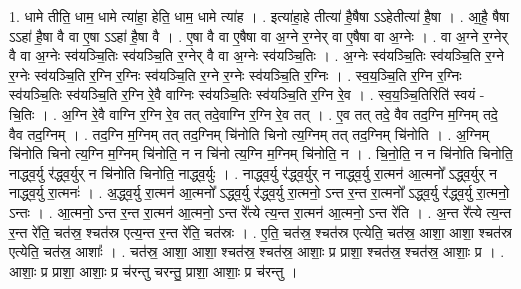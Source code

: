 \documentclass[17pt]{extarticle}
\begin{document}
1. धामे तीति॒ धाम॒ धामे त्या॑हा॒ हेति॒ धाम॒ धामे त्या॑ह । . इत्या॑हा॒हे तीत्या॑ है॒षैषा ऽऽहेतीत्या॑ है॒षा । . आ॒है॒ षैषा ऽऽहा॑ है॒षा वै वा ए॒षा ऽऽहा॑ है॒षा वै । . ए॒षा वै वा ए॒षैषा वा अ॒ग्ने र॒ग्नेर् वा ए॒षैषा वा अ॒ग्नेः । . वा अ॒ग्ने र॒ग्नेर् वै वा अ॒ग्नेः स्व॑यञ्चि॒तिः स्व॑यञ्चि॒ति र॒ग्नेर् वै वा अ॒ग्नेः स्व॑यञ्चि॒तिः । . अ॒ग्नेः स्व॑यञ्चि॒तिः स्व॑यञ्चि॒ति र॒ग्ने र॒ग्नेः स्व॑यञ्चि॒ति र॒ग्नि र॒ग्निः स्व॑यञ्चि॒ति र॒ग्ने र॒ग्नेः स्व॑यञ्चि॒ति र॒ग्निः । . स्व॒य॒ञ्चि॒ति र॒ग्नि र॒ग्निः स्व॑यञ्चि॒तिः स्व॑यञ्चि॒ति र॒ग्नि रे॒वै वाग्निः स्व॑यञ्चि॒तिः स्व॑यञ्चि॒ति र॒ग्नि रे॒व । . स्व॒य॒ञ्चि॒तिरिति॑ स्वयं - चि॒तिः । . अ॒ग्नि रे॒वै वाग्नि र॒ग्नि रे॒व तत् तदे॒वाग्नि र॒ग्नि रे॒व तत् । . ए॒व तत् तदे॒ वैव तद॒ग्नि म॒ग्निम् तदे॒ वैव तद॒ग्निम् । . तद॒ग्नि म॒ग्निम् तत् तद॒ग्निम् चि॑नोति चिनो त्य॒ग्निम् तत् तद॒ग्निम् चि॑नोति । . अ॒ग्निम् चि॑नोति चिनो त्य॒ग्नि म॒ग्निम् चि॑नोति॒ न न चि॑नो त्य॒ग्नि म॒ग्निम् चि॑नोति॒ न । . चि॒नो॒ति॒ न न चि॑नोति चिनोति॒ नाद्ध्व॒र्यु र॑द्ध्व॒र्युर् न चि॑नोति चिनोति॒ नाद्ध्व॒र्युः । . नाद्ध्व॒र्यु र॑द्ध्व॒र्युर् न नाद्ध्व॒र्यु रा॒त्मन॑ आ॒त्मनो᳚ ऽद्ध्व॒र्युर् न नाद्ध्व॒र्यु रा॒त्मनः॑ । . अ॒द्ध्व॒र्यु रा॒त्मन॑ आ॒त्मनो᳚ ऽद्ध्व॒र्यु र॑द्ध्व॒र्यु रा॒त्मनो॒ ऽन्त र॒न्त रा॒त्मनो᳚ ऽद्ध्व॒र्यु र॑द्ध्व॒र्यु रा॒त्मनो॒ ऽन्तः । . आ॒त्मनो॒ ऽन्त र॒न्त रा॒त्मन॑ आ॒त्मनो॒ ऽन्त रे᳚त्ये त्य॒न्त रा॒त्मन॑ आ॒त्मनो॒ ऽन्त रे॑ति । . अ॒न्त रे᳚त्ये त्य॒न्त र॒न्त रे॑ति॒ चत॑स्र॒ श्चत॑स्र एत्य॒न्त र॒न्त रे॑ति॒ चत॑स्रः । . ए॒ति॒ चत॑स्र॒ श्चत॑स्र एत्येति॒ चत॑स्र॒ आशा॒ आशा॒ श्चत॑स्र एत्येति॒ चत॑स्र॒ आशाः᳚ । . चत॑स्र॒ आशा॒ आशा॒ श्चत॑स्र॒ श्चत॑स्र॒ आशाः॒ प्र प्राशा॒ श्चत॑स्र॒ श्चत॑स्र॒ आशाः॒ प्र । . आशाः॒ प्र प्राशा॒ आशाः॒ प्र च॑रन्तु चरन्तु॒ प्राशा॒ आशाः॒ प्र च॑रन्तु । \newline
\end{document}
